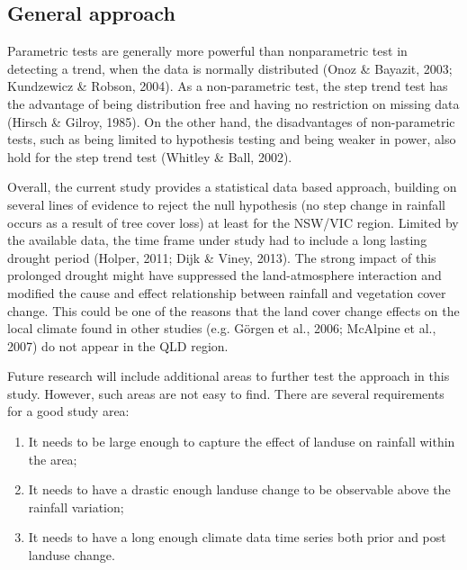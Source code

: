 \documentclass[fleqn,10pt,lineno]{wlpeerj} %
\providecommand{\tightlist}{
\setlength{\itemsep}{0pt}\setlength{\parskip}{0pt}}
\theoremstyle{definition}
\theoremstyle{definition}
\theoremstyle{definition}
\theoremstyle{remark}
\begin{document}
\subsection{General approach}\label{general-approach}

Parametric tests are generally more powerful than nonparametric test in
detecting a trend, when the data is normally distributed (Onoz \&
Bayazit, 2003; Kundzewicz \& Robson, 2004). As a non-parametric test,
the step trend test has the advantage of being distribution free and
having no restriction on missing data (Hirsch \& Gilroy, 1985). On the
other hand, the disadvantages of non-parametric tests, such as being
limited to hypothesis testing and being weaker in power, also hold for
the step trend test (Whitley \& Ball, 2002).

Overall, the current study provides a statistical data based approach,
building on several lines of evidence to reject the null hypothesis (no
step change in rainfall occurs as a result of tree cover loss) at least
for the NSW/VIC region. Limited by the available data, the time frame
under study had to include a long lasting drought period (Holper, 2011;
Dijk \& Viney, 2013). The strong impact of this prolonged drought might
have suppressed the land-atmosphere interaction and modified the cause
and effect relationship between rainfall and vegetation cover change.
This could be one of the reasons that the land cover change effects on
the local climate found in other studies (e.g. Görgen et al., 2006;
McAlpine et al., 2007) do not appear in the QLD region.

Future research will include additional areas to further test the
approach in this study. However, such areas are not easy to find. There
are several requirements for a good study area:

\begin{enumerate}
\def\labelenumi{\arabic{enumi}.}
\tightlist
\item
  It needs to be large enough to capture the effect of landuse on
  rainfall within the area;\\
\item
  It needs to have a drastic enough landuse change to be observable
  above the rainfall variation;\\
\item
  It needs to have a long enough climate data time series both prior and
  post landuse change.
\end{enumerate}
\end{document}
